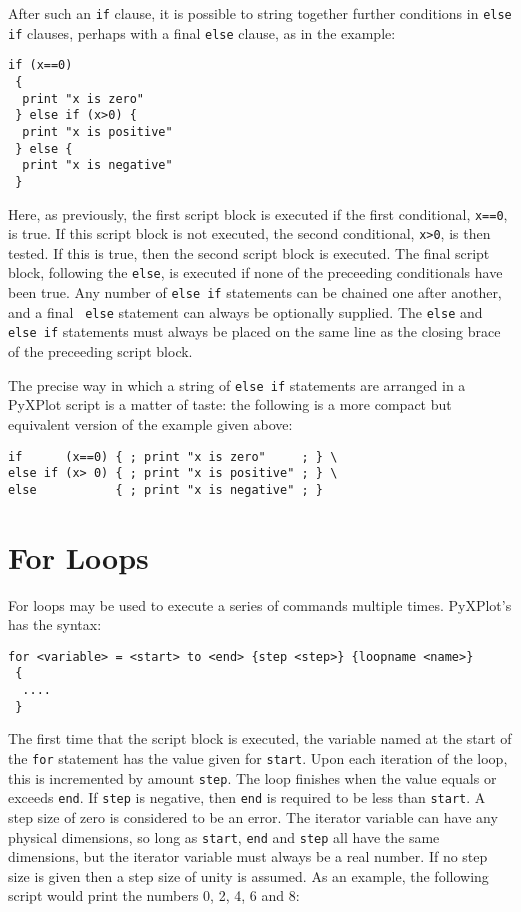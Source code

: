 After such an {\tt if} clause, it is possible to string together further
conditions in {\tt else if} clauses, perhaps with a final {\tt else} clause, as
in the example:

\begin{verbatim}
if (x==0)
 {
  print "x is zero"
 } else if (x>0) {
  print "x is positive"
 } else {
  print "x is negative"
 }
\end{verbatim}

Here, as previously, the first script block is executed if the first
conditional, {\tt x==0}, is true. If this script block is not executed, the
second conditional, {\tt x>0}, is then tested. If this is true, then the second
script block is executed.  The final script block, following the {\tt else}, is
executed if none of the preceeding conditionals have been true. Any number of
{\tt else if} statements can be chained one after another, and a final {\tt
else} statement can always be optionally supplied. The {\tt else} and {\tt else
if} statements must always be placed on the same line as the closing brace of
the preceeding script block.

The precise way in which a string of {\tt else if} statements are arranged in a
PyXPlot script is a matter of taste: the following is a more compact but
equivalent version of the example given above:

\begin{verbatim}
if      (x==0) { ; print "x is zero"     ; } \
else if (x> 0) { ; print "x is positive" ; } \
else           { ; print "x is negative" ; }
\end{verbatim}

\section{For Loops}

For loops may be used to execute a series of commands multiple times. PyXPlot's
 has the syntax:

\begin{verbatim}
for <variable> = <start> to <end> {step <step>} {loopname <name>}
 {
  ....
 }
\end{verbatim}

\noindent The first time that the script block is executed, the variable named
at the start of the {\tt for} statement has the value given for {\tt start}.
Upon each iteration of the loop, this is incremented by amount {\tt step}. The
loop finishes when the value equals or exceeds {\tt end}. If {\tt step} is
negative, then {\tt end} is required to be less than {\tt start}. A step size
of zero is considered to be an error.  The iterator variable can have any
physical dimensions, so long as {\tt start}, {\tt end} and {\tt step} all have
the same dimensions, but the iterator variable must always be a real number. If
no step size is given then a step size of unity is assumed.  As an example, the
following script would print the numbers 0, 2, 4, 6 and 8:

